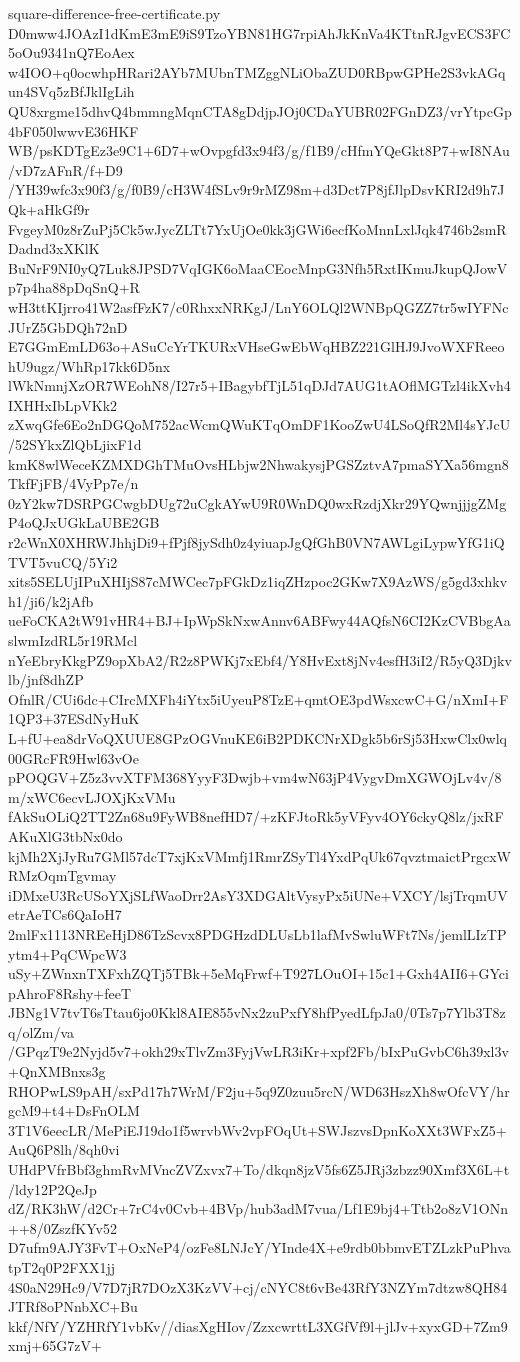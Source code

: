 \documentclass[11pt]{article}
\theoremstyle{definition}
\theoremstyle{remark}
\begin{document}
\begin{filecontents*}[overwrite]{square-difference-free-certificate.py}
D0mww4JOAzI1dKmE3mE9iS9TzoYBN81HG7rpiAhJkKnVa4KTtnRJgvECS3FC5oOu9341nQ7EoAex
w4IOO+q0ocwhpHRari2AYb7MUbnTMZggNLiObaZUD0RBpwGPHe2S3vkAGqun4SVq5zBfJklIgLih
QU8xrgme15dhvQ4bmmngMqnCTA8gDdjpJOj0CDaYUBR02FGnDZ3/vrYtpcGp4bF050lwwvE36HKF
WB/psKDTgEz3e9C1+6D7+wOvpgfd3x94f3/g/f1B9/cHfmYQeGkt8P7+wI8NAu/vD7zAFnR/f+D9
/YH39wfc3x90f3/g/f0B9/cH3W4fSLv9r9rMZ98m+d3Dct7P8jfJlpDsvKRI2d9h7JQk+aHkGf9r
FvgeyM0z8rZuPj5Ck5wJycZLTt7YxUjOe0kk3jGWi6ecfKoMnnLxlJqk4746b2smRDadnd3xXKlK
BuNrF9NI0yQ7Luk8JPSD7VqIGK6oMaaCEocMnpG3Nfh5RxtIKmuJkupQJowVp7p4ha88pDqSnQ+R
wH3ttKIjrro41W2asfFzK7/c0RhxxNRKgJ/LnY6OLQl2WNBpQGZZ7tr5wIYFNcJUrZ5GbDQh72nD
E7GGmEmLD63o+ASuCcYrTKURxVHseGwEbWqHBZ221GlHJ9JvoWXFReeohU9ugz/WhRp17kk6D5nx
lWkNmnjXzOR7WEohN8/I27r5+IBagybfTjL51qDJd7AUG1tAOflMGTzl4ikXvh4IXHHxIbLpVKk2
zXwqGfe6Eo2nDGQoM752acWcmQWuKTqOmDF1KooZwU4LSoQfR2Ml4sYJcU/52SYkxZlQbLjixF1d
kmK8wlWeceKZMXDGhTMuOvsHLbjw2NhwakysjPGSZztvA7pmaSYXa56mgn8TkfFjFB/4VyPp7e/n
0zY2kw7DSRPGCwgbDUg72uCgkAYwU9R0WnDQ0wxRzdjXkr29YQwnjjjgZMgP4oQJxUGkLaUBE2GB
r2cWnX0XHRWJhhjDi9+fPjf8jySdh0z4yiuapJgQfGhB0VN7AWLgiLypwYfG1iQTVT5vuCQ/5Yi2
xits5SELUjIPuXHIjS87cMWCec7pFGkDz1iqZHzpoc2GKw7X9AzWS/g5gd3xhkvh1/ji6/k2jAfb
ueFoCKA2tW91vHR4+BJ+IpWpSkNxwAnnv6ABFwy44AQfsN6CI2KzCVBbgAaslwmIzdRL5r19RMcl
nYeEbryKkgPZ9opXbA2/R2z8PWKj7xEbf4/Y8HvExt8jNv4esfH3iI2/R5yQ3Djkvlb/jnf8dhZP
OfnlR/CUi6dc+CIrcMXFh4iYtx5iUyeuP8TzE+qmtOE3pdWsxcwC+G/nXmI+F1QP3+37ESdNyHuK
L+fU+ea8drVoQXUUE8GPzOGVnuKE6iB2PDKCNrXDgk5b6rSj53HxwClx0wlq00GRcFR9Hwl63vOe
pPOQGV+Z5z3vvXTFM368YyyF3Dwjb+vm4wN63jP4VygvDmXGWOjLv4v/8m/xWC6ecvLJOXjKxVMu
fAkSuOLiQ2TT2Zn68u9FyWB8nefHD7/+zKFJtoRk5yVFyv4OY6ckyQ8lz/jxRFAKuXlG3tbNx0do
kjMh2XjJyRu7GMl57dcT7xjKxVMmfj1RmrZSyTl4YxdPqUk67qvztmaictPrgcxWRMzOqmTgvmay
iDMxeU3RcUSoYXjSLfWaoDrr2AsY3XDGAltVysyPx5iUNe+VXCY/lsjTrqmUVetrAeTCs6QaIoH7
2mlFx1113NREeHjD86TzScvx8PDGHzdDLUsLb1lafMvSwluWFt7Ns/jemlLIzTPytm4+PqCWpcW3
uSy+ZWnxnTXFxhZQTj5TBk+5eMqFrwf+T927LOuOI+15c1+Gxh4AII6+GYcipAhroF8Rshy+feeT
JBNg1V7tvT6sTtau6jo0Kkl8AIE855vNx2zuPxfY8hfPyedLfpJa0/0Ts7p7Ylb3T8zq/olZm/va
/GPqzT9e2Nyjd5v7+okh29xTlvZm3FyjVwLR3iKr+xpf2Fb/bIxPuGvbC6h39xl3v+QnXMBnxs3g
RHOPwLS9pAH/sxPd17h7WrM/F2ju+5q9Z0zuu5rcN/WD63HszXh8wOfcVY/hrgcM9+t4+DsFnOLM
3T1V6eecLR/MePiEJ19do1f5wrvbWv2vpFOqUt+SWJszvsDpnKoXXt3WFxZ5+AuQ6P8lh/8qh0vi
UHdPVfrBbf3ghmRvMVncZVZxvx7+To/dkqn8jzV5fs6Z5JRj3zbzz90Xmf3X6L+t/ldy12P2QeJp
dZ/RK3hW/d2Cr+7rC4v0Cvb+4BVp/hub3adM7vua/Lf1E9bj4+Ttb2o8zV1ONn++8/0ZszfKYv52
D7ufm9AJY3FvT+OxNeP4/ozFe8LNJcY/YInde4X+e9rdb0bbmvETZLzkPuPhvatpT2q0P2FXX1jj
4S0aN29Hc9/V7D7jR7DOzX3KzVV+cj/cNYC8t6vBe43RfY3NZYm7dtzw8QH84JTRf8oPNnbXC+Bu
kkf/NfY/YZHRfY1vbKv//diasXgHIov/ZzxcwrttL3XGfVf9l+jlJv+xyxGD+7Zm9xmj+65G7zV+

\end{filecontents*}
\end{document}

